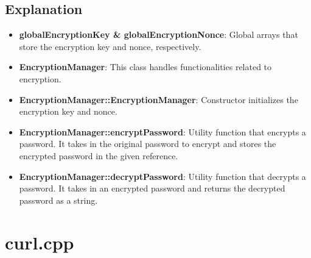\documentclass{article}
\begin{document}
	\subsection*{Explanation}
	\begin{itemize}
		\item \textbf{globalEncryptionKey \& globalEncryptionNonce}: Global arrays that store the encryption key and nonce, respectively.
		\item \textbf{EncryptionManager}: This class handles functionalities related to encryption.
		\item \textbf{EncryptionManager::EncryptionManager}: Constructor initializes the encryption key and nonce.
		\item \textbf{EncryptionManager::encryptPassword}: Utility function that encrypts a password. It takes in the original password to encrypt and stores the encrypted password in the given reference.
		\item \textbf{EncryptionManager::decryptPassword}: Utility function that decrypts a password. It takes in an encrypted password and returns the decrypted password as a string.
	\end{itemize}
	
	\section{curl.cpp}
	
\end{document}
